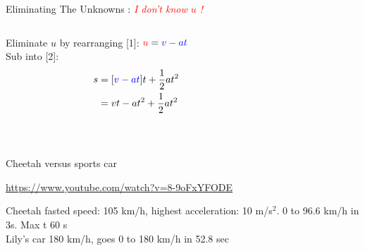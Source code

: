 \begin{frame}{ Eliminating The Unknowns  : \textit{\textcolor{red}{I don't know $u$ !} }}
\small

\begin{columns}[T]
\begin{column}{0.7\textwidth}
Eliminate $u$ by rearranging [1]: $\textcolor{red}{u}= \textcolor{blue}{ v - at}$\\[1ex]
Sub into [2]: 
\begin{equation}\nonumber
\begin{split}
s  &= [\textcolor{blue}{ v - at}] t + \frac{1}{2} at^2  \\
& = vt - at^2 + \frac{1}{2} at^2 \\
\end{split}
\end{equation}
\end{column}\hfill

\begin{column}{0.3\textwidth}
       
 \\[1ex] 
 \\[3ex] 
\end{column}
\end{columns}

\vspace{0.5cm}
  \\[1ex]

\end{frame}




\begin{frame}{Cheetah versus sports car}

\href{https://www.youtube.com/watch?v=8-9oFxYFODE}{https://www.youtube.com/watch?v=8-9oFxYFODE}


Cheetah fasted speed: 105 km/h,  highest acceleration: 10 m/s$^2$. 0 to 96.6 km/h in 3s. Max t 60 s\\
Lily's car 180 km/h, goes 0 to 180 km/h  in 52.8 sec\\


\end{frame}



